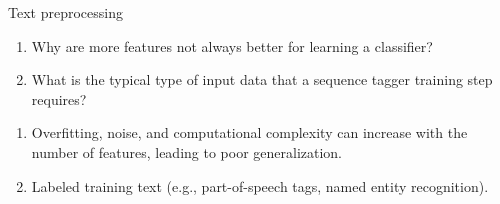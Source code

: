 \documentclass{article}
\begin{document}
\begin{exercise}{Text preprocessing}
  \begin{enumerate}
    \item Why are more features not always better for learning a classifier?
    \item What is the typical type of input data that a sequence tagger training step requires?
  \end{enumerate}

  \begin{solution}
    \begin{enumerate}
      \item Overfitting, noise, and computational complexity can increase with the number of features, leading to poor generalization.
      \item Labeled training text (e.g., part-of-speech tags, named entity recognition).
    \end{enumerate}
  \end{solution}
\end{exercise}
\end{document}
